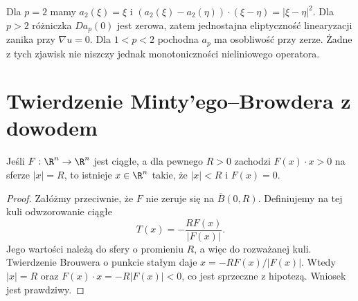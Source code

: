 \begin{przyklad}[Dlaczego $p=2$ jest szczególny]
Dla $p=2$ mamy $a_2(\xi)=\xi$ i
$(a_2(\xi)-a_2(\eta))\cdot(\xi-\eta)=|\xi-\eta|^2$.
Dla $p>2$ różniczka $Da_p(0)$ jest zerowa, zatem
jednostajna eliptyczność linearyzacji zanika przy
$\nabla u=0$. Dla $1<p<2$ pochodna $a_p$ ma
osobliwość przy zerze. Żadne z tych zjawisk nie
niszczy jednak monotoniczności nieliniowego operatora.
\end{przyklad}

\section{Twierdzenie Minty'ego--Browdera z dowodem}
\begin{lemat}
\label{lem:pde26-brouwer}
Jeśli $F:\R^n\to\R^n$ jest ciągłe, a dla pewnego
$R>0$ zachodzi $F(x)\cdot x>0$ na sferze $|x|=R$,
to istnieje $x\in\R^n$ takie, że $|x|<R$ i $F(x)=0$.
\end{lemat}
\begin{proof}
Załóżmy przeciwnie, że $F$ nie zeruje się na
$\overline B(0,R)$. Definiujemy na tej kuli
odwzorowanie ciągłe
\[
 T(x)=-\frac{RF(x)}{|F(x)|}.
\]
Jego wartości należą do sfery o promieniu $R$,
a więc do rozważanej kuli. Twierdzenie Brouwera
o punkcie stałym daje $x=-RF(x)/|F(x)|$.
Wtedy $|x|=R$ oraz $F(x)\cdot x=-R|F(x)|<0$,
co jest sprzeczne z hipotezą. Wniosek jest prawdziwy.
\end{proof}

